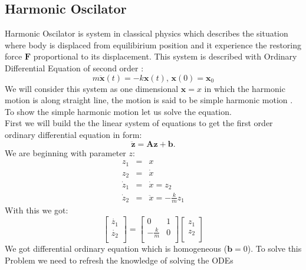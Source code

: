 \subsection{Harmonic Oscilator}
Harmonic Oscilator is  system  in classical physics which describes the situation where body is displaced from equilibirium position and it experience the restoring force $\mathbf{F}$ proportional to its displacement. This system is described with Ordinary Differential Equation of second order : 
\begin{equation}
	m\ddot{\mathbf{x}}(t) = -k\mathbf{x}(t) \texttt{,   } \mathbf{x}(0)= \mathbf{x}_0
\end{equation}
We will consider this system as one dimensional $\mathbf{x}= x$
in which the harmonic motion is along straight line, the motion is said to be simple harmonic motion \cite{osci}. To show the simple harmonic motion let us solve the equation.\\
First we will build the the linear system of equations to get the first order ordinary differential equation in form: \begin{equation}
	\ddot{\mathbf{z}}= \mathbf{A}\mathbf{z} + \mathbf{b}.
\end{equation}
We are beginning with parameter $z$:
\begin{eqnarray}
	z_1 &=& x\\
	z_2 &=& \dot{x}\\
	\dot{z}_1 &=& \dot{x} = z_2\\
	\dot{z}_2 &=& \ddot{x} = -\frac{k}{m}z_1 
\end{eqnarray}
With this we got:
\begin{equation}
	\begin{bmatrix}
		\dot{z_1}\\
		\dot{z_2}\\
	\end{bmatrix} = \begin{bmatrix}
	0 & 1\\
	-\frac{k}{m} & 0\\
	\end{bmatrix}
	\begin{bmatrix}
		z_1\\
		z_2\\
	\end{bmatrix}
\end{equation}
We got differential ordinary equation which is homogeneous ($\mathbf{b}=0$). To solve this Problem we need to refresh the knowledge of solving the ODEs 


